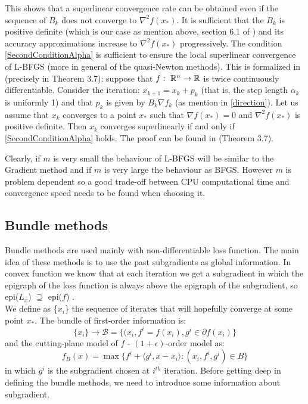 This shows that a superlinear convergence rate can be obtained even if the sequence of $B_{k}$ does not converge to $\nabla^2f(x_*)$. It is sufficient that the $B_{k}$ is positive definite (which is our case as mention above, section 6.1 of \cite{numerical}) and its accuracy approximations increase to $\nabla^2f(x_*)$ progressively. The condition \ref{SecondConditionAlpha} is sufficient to ensure the local superlinear convergence of L-BFGS (more in general of the quasi-Newton methods). This is formalized in \cite{numerical} (precisely in Theorem 3.7):
suppose that $f: \textnormal{ }\mathbb{R}^n \rightarrow \mathbb{R}$ is twice continuously differentiable. Consider the iteration: $x_{k+1}=x_{k} + p_{k}$ (that is, the step length $\alpha_{k}$ is uniformly 1) and that $p_{k}$ is given by $B_{k}\nabla f_{k}$ (as mention in \ref{direction}). Let us assume that $x_{k}$ converges to a point $x_{*}$ such that $\nabla f(x_{*}) = 0$ and $\nabla^2f(x_{*})$ is positive definite. Then $x_{k}$ converges superlinearly if and only if \ref{SecondConditionAlpha} holds. The proof can be found in \cite{numerical} (Theorem 3.7). 

Clearly, if $m$ is very small the behaviour of L-BFGS will be similar to the Gradient method and if $m$ is very large the behaviour as BFGS. However $m$ is problem dependent so a good trade-off between CPU computational time and convergence speed needs to be found when choosing it.

\subsection{Bundle methods}
\label{Bundle-methods}
Bundle methods are used mainly with non-differentiable loss function. The main idea of these methods is to use the past subgradients as global information. In convex function we know that at each iteration we get a subgradient in which the epigraph of the loss function is always above the epigraph of the subgradient, so epi($L_x$) $ \supseteq $ epi($f$) .\\ 
We define as \{$x_i$\} the sequence of iterates that will hopefully converge at some point $x_*$. 
The bundle of first-order information is:
\begin{equation}
\{x_i\}\rightarrow \mathcal{B}=\{(x_i, f^i=f(x_i), g^i \in \partial f(x_i)\}
\end{equation}
and the cutting-plane model of $f$ - $(1 +\epsilon)$-order model as:
\begin{equation}
\label{CP-model}
f_B(x) = \max{\{f^i+ \langle g^i,x - x_i \rangle:  (x_i,f^i,g^i)\in B\}}
\end{equation}
in which $g^i$ is the subgradient chosen at $i^{th}$ iteration.
Before getting deep in defining the bundle methods, we need to introduce some information about subgradient.
